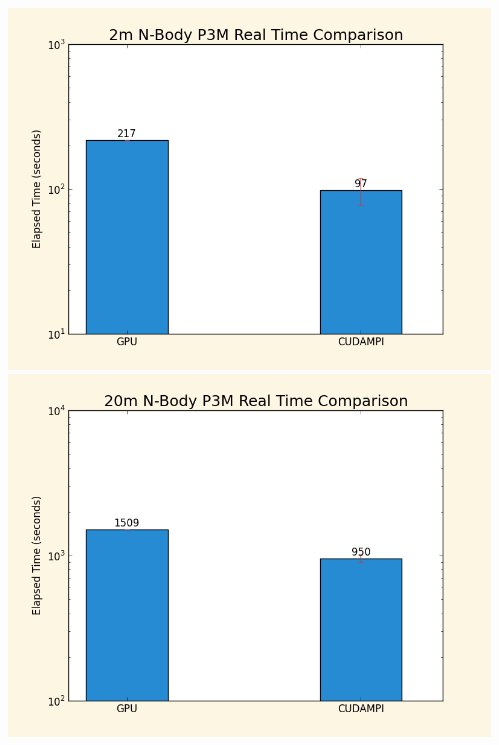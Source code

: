 \documentclass[17pt,hyperref={pdfpagelabels=false}]{beamer}
\newlength{\onecolumnwidth}
\begin{document}
\begin{frame}[t]
\begin{columns}[t,onlytextwidth=\textwidth]
\begin{column}{0.99\paperwidth}
\begin{columns}[t,onlytextwidth=\textwidth]
\begin{column}[t,onlytextwidth=\textwidth]{\onecolumnwidth}
            \hfill{}\\{}
            \includegraphics[scale=0.9]{2m_bar_chart_solarized.png}
            \includegraphics[scale=0.9]{20m_bar_chart_solarized.png}
        \end{column}
        \begin{column}[t,onlytextwidth=\textwidth]{\onecolumnwidth}
            
            
            
            \vspace{1cm}

\end{column}
\end{columns}
\end{column}
\end{columns}
\end{frame}
\end{document}
